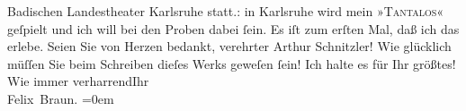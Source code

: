 \begin{ledgroupsized}[t]{13cm}
{{{                            Badischen Landestheater Karlsruhe
                        statt.}}}\label{K_L02468_1h}: in Karlsruhe wird mein »\textsc{Tantalos}« geſpielt und ich will bei den {\pb}Proben
                    dabei ſein. Es iſt zum erſten Mal, daß ich das erlebe.\pend
           \pstart
           Seien Sie von Herzen bedankt, verehrter Arthur Schnitzler! Wie glücklich müſſen
                    Sie beim Schreiben dieſes Werks geweſen ſein! Ich halte es für Ihr größtes!\pend
           \pstart
           Wie immer verharrend\hspace*{1.5em}Ihr{\\[\baselineskip]}\spacefill\mbox{Felix Braun.}\pend
           \leftskip=0em{}          \endnumbering{}\end{ledgroupsized}  \newcommand{\dateiname}{L02468}\newcommand{\titel}{Felix Braun an Arthur Schnitzler, 15. 3. 1926}\newcommand{\editorInnen}{Martin Anton Müller und Gerd-Hermann Susen}
            \footnotesize
\begin{ledgroupsized}[t]{11.5cm}
\end{ledgroupsized}
         
      